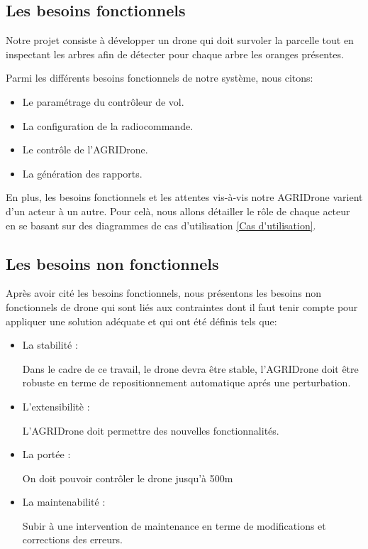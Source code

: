 	\subsection{Les besoins fonctionnels}
	Notre projet consiste à développer un drone qui doit survoler la parcelle tout en inspectant les arbres afin de détecter pour chaque arbre les oranges présentes.
	
	Parmi les différents besoins fonctionnels de notre système, nous citons:
	\begin{itemize}
		\item Le paramétrage du contrôleur de vol. 
		\item  La configuration de la radiocommande. 
		\item Le contrôle de l'AGRIDrone.
		\item La génération des rapports. 
	\end{itemize} 
	
	En plus, les besoins fonctionnels et les attentes vis-à-vis notre AGRIDrone varient d'un acteur à un autre. Pour celà, nous allons détailler le rôle de chaque acteur en se basant sur des diagrammes de cas d'utilisation \ref{Cas d'utilisation}.
	
	\subsection{Les besoins non fonctionnels}
	Après avoir cité les besoins fonctionnels, nous présentons
	les besoins non fonctionnels de drone qui sont liés aux contraintes dont il faut tenir compte pour appliquer une solution adéquate et qui ont été définis tels que:
	\begin{itemize}
		\item La stabilité :
		
		
		Dans le cadre de ce travail, le drone devra être stable, l'AGRIDrone doit être robuste en terme de repositionnement automatique aprés une perturbation.	
		
		\item L'extensibilitè : 
		
		
		L'AGRIDrone doit permettre des nouvelles fonctionnalités.
		
		\item La portée : 
		
		
		On doit pouvoir contrôler le drone jusqu'à 500m
		
		
		\item La maintenabilité : 
		
		Subir à une intervention de maintenance en terme de modifications et corrections des erreurs.
		\end {itemize}
